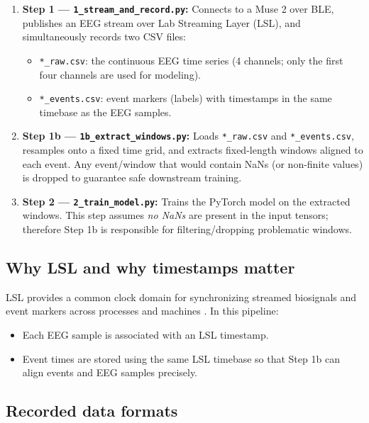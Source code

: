 \documentclass[11pt,openany]{book}
\begin{document}
\begin{enumerate}
  \item \textbf{Step 1 --- \texttt{1\_stream\_and\_record.py}:} Connects to a Muse 2 over BLE, publishes an EEG stream over Lab Streaming Layer (LSL), and simultaneously records two CSV files:
  \begin{itemize}
    \item \texttt{*\_raw.csv}: the continuous EEG time series (4 channels; only the first four channels are used for modeling).
    \item \texttt{*\_events.csv}: event markers (labels) with timestamps in the same timebase as the EEG samples.
  \end{itemize}
  \item \textbf{Step 1b --- \texttt{1b\_extract\_windows.py}:} Loads \texttt{*\_raw.csv} and \texttt{*\_events.csv}, resamples onto a fixed time grid, and extracts fixed-length windows aligned to each event. Any event/window that would contain NaNs (or non-finite values) is dropped to guarantee safe downstream training.
  \item \textbf{Step 2 --- \texttt{2\_train\_model.py}:} Trains the PyTorch model on the extracted windows. This step assumes \emph{no NaNs} are present in the input tensors; therefore Step 1b is responsible for filtering/dropping problematic windows.
\end{enumerate}

\subsection{Why LSL and why timestamps matter}
LSL provides a common clock domain for synchronizing streamed biosignals and event markers across processes and machines \cite{LSL, pylsl}. In this pipeline:

\begin{itemize}
  \item Each EEG sample is associated with an LSL timestamp.
  \item Event times are stored using the same LSL timebase so that Step 1b can align events and EEG samples precisely.
\end{itemize}

\subsection{Recorded data formats}
\end{document}
